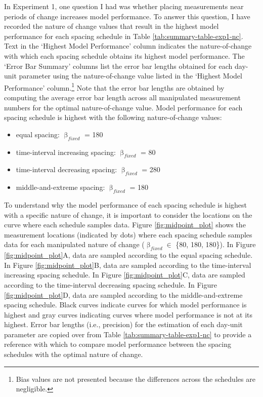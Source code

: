 \documentclass[
12pt, %
twoside,
english]{guelphthesis}
\begin{document}
In Experiment 1, one question I had was whether placing measurements near periods of change increases model performance. To answer this question, I have recorded the nature of change values that result in the highest model performance for each spacing schedule in Table \ref{tab:summary-table-exp1-nc}. Text in the `Highest Model Performance' column indicates the nature-of-change with which each spacing schedule obtains its highest model performance. The `Error Bar Summary' columns list the error bar lengths obtained for each day-unit parameter using the nature-of-change value listed in the `Highest Model Performance' column.\footnote{Bias values are not presented because the differences across the schedules are negligible.} Note that the error bar lengths are obtained by computing the average error bar length across all manipulated measurement numbers for the optimal nature-of-change value. Model performance for each spacing schedule is highest with the following nature-of-change values:
\begin{itemize}
\tightlist
\item
  equal spacing: \(\upbeta_{fixed}\) = 180
\item
  time-interval increasing spacing: \(\upbeta_{fixed}\) = 80
\item
  time-interval decreasing spacing: \(\upbeta_{fixed}\) = 280
\item
  middle-and-extreme spacing: \(\upbeta_{fixed}\) = 180
\end{itemize}
To understand why the model performance of each spacing schedule is highest with a specific nature of change, it is important to consider the locations on the curve where each schedule samples data. Figure \ref{fig:midpoint_plot} shows the measurement locations (indicated by dots) where each spacing schedule samples data for each manipulated nature of change (\(\upbeta_{fixed} \in\) \{80, 180, 180\}). In Figure \ref{fig:midpoint_plot}A, data are sampled according to the equal spacing schedule. In Figure \ref{fig:midpoint_plot}B, data are sampled according to the time-interval increasing spacing schedule. In Figure \ref{fig:midpoint_plot}C, data are sampled according to the time-interval decreasing spacing schedule. In Figure \ref{fig:midpoint_plot}D, data are sampled according to the middle-and-extreme spacing schedule. Black curves indicate curves for which model performance is highest and gray curves indicating curves where model performance is not at its highest. Error bar lengths (i.e., precision) for the estimation of each day-unit parameter are copied over from Table \ref{tab:summary-table-exp1-nc} to provide a reference with which to compare model performance between the spacing schedules with the optimal nature of change.
\end{document}
